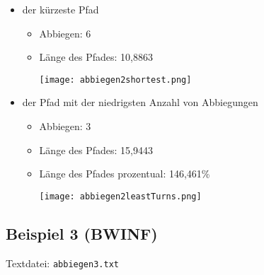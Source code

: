 \documentclass[a4paper,10pt,ngerman]{scrartcl}
\begin{document}
\begin{itemize}
  \item der kürzeste Pfad   
    \begin{itemize}
      \item Abbiegen: 6
      \item Länge des Pfades: 10,8863
\begin{center}
\texttt{[image: abbiegen2shortest.png]}
\end{center}
    \end{itemize}
  \item der Pfad mit der niedrigsten Anzahl von Abbiegungen    
    \begin{itemize}
      \item Abbiegen: 3
      \item Länge des Pfades: 15,9443
      \item Länge des Pfades prozentual: 146,461\%
\begin{center}
\texttt{[image: abbiegen2leastTurns.png]}
\end{center}
    \end{itemize}
\end{itemize}

\subsection{Beispiel 3 (BWINF)}
Textdatei: \texttt{abbiegen3.txt}
\end{document}
